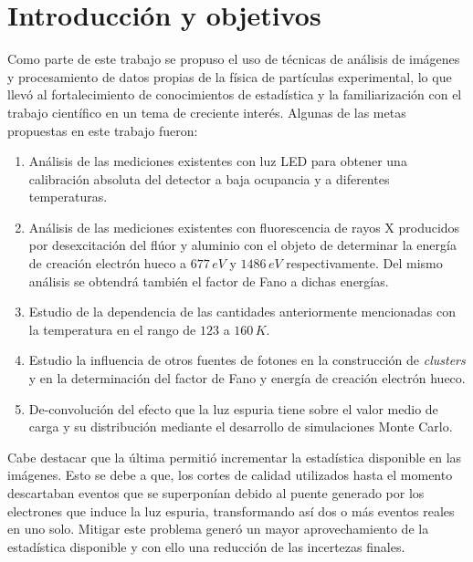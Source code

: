 \chapter{Introducción y objetivos}
\noindent Como parte de este trabajo se propuso el uso de técnicas de análisis de imágenes y procesamiento de datos propias de la física de partículas experimental, lo que llevó al fortalecimiento de conocimientos de estadística y la familiarización con el trabajo científico en un tema de creciente interés. 
Algunas de las metas propuestas en este trabajo fueron:
\begin{enumerate}
    \item Análisis de las mediciones existentes con luz LED para obtener una calibración absoluta del detector a baja ocupancia y a diferentes temperaturas.
    \item Análisis de las mediciones existentes con fluorescencia de rayos X producidos por desexcitación del flúor y aluminio con el objeto de determinar la energía de creación electrón hueco a $677\,\si{eV}$ y $1486\,\si{eV}$ respectivamente. Del mismo análisis se obtendrá también el factor de Fano a dichas energías.
    \item Estudio de la dependencia de las cantidades anteriormente mencionadas con la temperatura en el rango de $123$ a $160\,K$.
    \item Estudio la influencia de otros fuentes de fotones en la construcción de \textit{clusters} y en la determinación del factor de Fano y energía de creación electrón hueco.
    \item De-convolución del efecto que la luz espuria tiene sobre el valor medio de carga y su distribución mediante el desarrollo de simulaciones Monte Carlo.
\end{enumerate}
Cabe destacar que la última permitió incrementar la estadística disponible en las imágenes. Esto se debe a que, los cortes de calidad utilizados hasta el momento descartaban eventos que se superponían debido al puente generado por los electrones que induce la luz espuria, transformando así dos o más eventos reales en uno solo. Mitigar este problema generó un mayor aprovechamiento de la estadística disponible y con ello una reducción de las incertezas finales.

